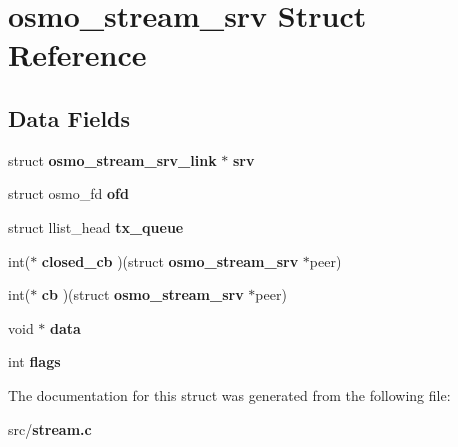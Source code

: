 \section{osmo\+\_\+stream\+\_\+srv Struct Reference}
\label{structosmo__stream__srv}
\subsection*{Data Fields}
\begin{DoxyCompactItemize}
\item 
struct {\bf osmo\+\_\+stream\+\_\+srv\+\_\+link} $\ast$ {\bfseries srv}\label{structosmo__stream__srv_ab5f8b381f95a1e6eb1f5301750ced81c}

\item 
struct osmo\+\_\+fd {\bfseries ofd}\label{structosmo__stream__srv_a5bebfa86d9726ea54ebcdb757feacdd6}

\item 
struct llist\+\_\+head {\bfseries tx\+\_\+queue}\label{structosmo__stream__srv_a32c1988d4336214cc07f53c1b3ee276d}

\item 
int($\ast$ {\bfseries closed\+\_\+cb} )(struct {\bf osmo\+\_\+stream\+\_\+srv} $\ast$peer)\label{structosmo__stream__srv_a80d01e74ab3a0782a4cc891c2f500248}

\item 
int($\ast$ {\bfseries cb} )(struct {\bf osmo\+\_\+stream\+\_\+srv} $\ast$peer)\label{structosmo__stream__srv_a5e2827dbf42603372bcd2d127a9a7d68}

\item 
void $\ast$ {\bfseries data}\label{structosmo__stream__srv_a549ad7d39ea797afc86da4497ee8b5a3}

\item 
int {\bfseries flags}\label{structosmo__stream__srv_ac71e48886a24e00f73543b5cf3bdcc58}

\end{DoxyCompactItemize}


The documentation for this struct was generated from the following file\+:\begin{DoxyCompactItemize}
\item 
src/{\bf stream.\+c}\end{DoxyCompactItemize}
